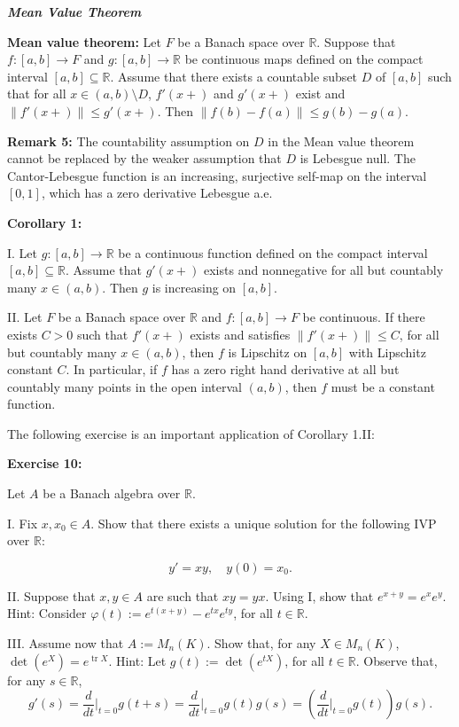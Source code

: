 \documentclass{book}
\begin{document}
\newpage
\begin{center}
    \textbf{\textit{Mean Value Theorem}}
\end{center}

\textbf{Mean value theorem:}
Let $F$ be a Banach space over $\mathbb{R}$. Suppose that $f : [a, b] \to F$ and $g : [a, b] \to \mathbb{R}$ be continuous maps defined on the compact interval $[a, b] \subseteq \mathbb{R}$. Assume that there exists a countable subset $D$ of $[a, b]$ such that for all $x \in (a, b) \setminus D$, $f'(x+)$ and $g'(x+)$ exist and $\|f'(x+)\| \leq g'(x+)$. Then $\|f(b) - f(a)\| \leq g(b) - g(a)$.

\textbf{Remark 5:} The countability assumption on $D$ in the Mean value theorem cannot be replaced by the weaker assumption that $D$ is Lebesgue null. The Cantor-Lebesgue function is an increasing, surjective self-map on the interval $[0, 1]$, which has a zero derivative Lebesgue a.e.

\textbf{Corollary 1:}

I. Let $g : [a, b] \to \mathbb{R}$ be a continuous function defined on the compact interval $[a, b] \subseteq \mathbb{R}$. Assume that $g'(x+)$ exists and nonnegative for all but countably many $x \in (a, b)$. Then $g$ is increasing on $[a, b]$.

II. Let $F$ be a Banach space over $\mathbb{R}$ and $f : [a, b] \to F$ be continuous. If there exists $C > 0$ such that $f'(x+)$ exists and satisfies $\|f'(x+)\| \leq C$, for all but countably many $x \in (a, b)$, then $f$ is Lipschitz on $[a, b]$ with Lipschitz constant $C$. In particular, if $f$ has a zero right hand derivative at all but countably many points in the open interval $(a, b)$, then $f$ must be a constant function.

The following exercise is an important application of Corollary 1.II:


\textbf{Exercise 10:}

Let $A$ be a Banach algebra over $\mathbb{R}$.

I. Fix $x, x_0 \in A$. Show that there exists a unique solution for the following IVP over $\mathbb{R}$:

\[
y' = xy, \quad y(0) = x_0.
\]

II. Suppose that $x, y \in A$ are such that $xy = yx$. Using I, show that $e^{x+y} = e^x e^y$. Hint: Consider $\varphi(t) := e^{t(x+y)} - e^{tx}e^{ty}$, for all $t \in \mathbb{R}$.

III. Assume now that $A := M_n(K)$. Show that, for any $X \in M_n(K)$, $\det(e^X) = e^{\operatorname{tr} X}$. Hint: Let $g(t) := \det(e^{tX})$, for all $t \in \mathbb{R}$. Observe that, for any $s \in \mathbb{R}$,
\[
g'(s) = \frac{d}{dt}\bigg|_{t=0} g(t + s) = \frac{d}{dt}\bigg|_{t=0} g(t)g(s) = \left( \frac{d}{dt}\bigg|_{t=0} g(t) \right) g(s).
\]
\end{document}
